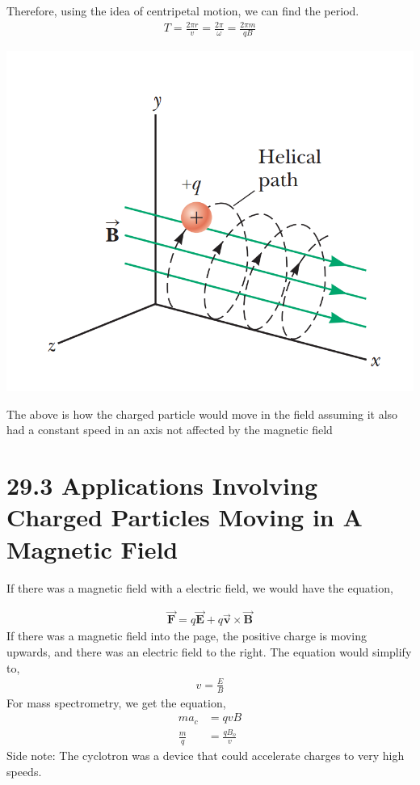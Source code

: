 \documentclass[12pt, titlepage, oneside]{article}
\let\oldvec\vec
\renewcommand{\vec}[1]{\oldvec{\bm{#1}}}
\begin{document}
Therefore, using the idea of centripetal motion, we can find the period.
\begin{align*}
T = \frac{2\pi r}{v} = \frac{2\pi}{\omega} = \frac{2\pi m}{qB}
\end{align*}
\begin{center}
\includegraphics[scale=.5]{3.png}
\end{center}
	The above is how the charged particle would move in the field assuming it also had a constant speed in an axis not affected by the magnetic field
\newpage 
\section*{29.3 Applications Involving Charged Particles Moving in A Magnetic Field}

If there was a magnetic field with a electric field, we would have the equation,

\begin{align*}
\vec{F} = q\vec{E} + q\vec{v} \times \vec{B} 
\end{align*}
If there was a magnetic field into the page, the positive charge is moving upwards, and there was an electric field to the right. The equation would simplify to,
\begin{align*}
v = \frac{E}{B}
\end{align*}
For mass spectrometry, we get the equation,
\begin{align*}
	m a_c &= qvB \\
	\frac{m}{q} &= \frac{qB_o}{v}
\end{align*}
Side note: The cyclotron was a device that could accelerate charges to very high speeds.
\\
\end{document}

